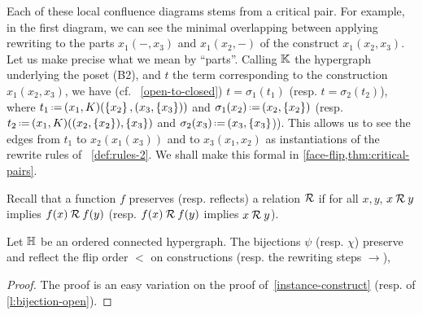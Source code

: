 Each of these local confluence diagrams stems from a critical pair. 
For example, in the first diagram, we can see the minimal overlapping between applying rewriting to the parts $x_1(-,x_3)$ and $x_1(x_2,-)$ of the construct $x_1(x_2,x_3)$.   Let us make precise what we mean by ``parts''.
Calling ${\mathbb K}$ the hypergraph underlying the poset (B2), and $t$ the term corresponding to the construction $x_1(x_2,x_3)$, we have
(cf.~ \cref{open-to-closed})
$t=\sigma_1(t_1)$ (resp.  $t=\sigma_2(t_2)$), where $t_1 \eqdef (x_1,K)(\set{x_2},(x_3,\set{x_3}))$ and $\sigma_1(x_2)\eqdef (x_2,\set{x_2})$ (resp.
$t_2\eqdef (x_1,K)((x_2,\set{x_2}),\set{x_3})$ and $\sigma_2(x_3)\eqdef (x_3,\set{x_3}$)). This allows us to see 
the edges from $t_1$  to $x_2(x_1(x_3))$  and to  $x_3(x_1,x_2)$ as instantiations of the rewrite rules of~ \cref{def:rules-2}. We shall make this formal in \cref{face-flip,thm:critical-pairs}. 

Recall that a function $f$ preserves (resp. reflects) a relation  ${\cal R}$ if for all $x,y$, $x\:{\cal R}\:y$ implies $f(x)\:{\cal R}\: f(y)$ (resp.  $f(x)\:{\cal R} \:f(y)$ implies
$x\:{\cal R}\:y$).

\begin{lemma} \label{face-flip}
  Let ${\mathbb H}$ be an ordered connected hypergraph.  The bijections $\psi$ (resp. $\chi$)
 preserve and reflect the flip order $<$ on constructions (resp. the rewriting steps $\to$),
 
 

\end{lemma}
\begin{proof} The proof is an easy variation on the proof of~\cref{instance-construct} (resp. of  \cref{l:bijection-open}).

\end{proof}


